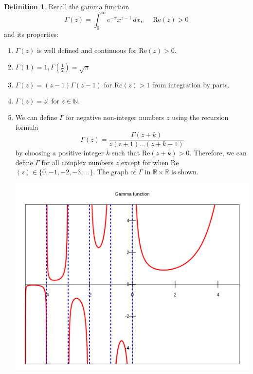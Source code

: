 \documentclass{article}
\theoremstyle{remark}
\theoremstyle{definition}
\newtheorem{definition}{Definition}[section]
\begin{document}
      \begin{definition}
      Recall the gamma function
      \[\Gamma (z) = \int_0^\infty e^{-x} x^{z-1} \,dx, \;\;\;\;\; \text{Re}(z) > 0\]
      and its properties: 
      \begin{enumerate}
          \item $\Gamma(z)$ is well defined and continuous for Re$(z) > 0$. 
          \item $\Gamma(1) = 1, \Gamma(\frac{1}{2}) = \sqrt{\pi}$
          \item $\Gamma(z) = (z-1) \Gamma (z-1)$ for Re$(z) > 1$ from integration by parts. 
          \item $\Gamma(z) = z!$ for $z \in \mathbb{N}$. 
          \item We can define $\Gamma$ for negative non-integer numbers $z$ using the recursion formula 
          \[\Gamma(z) = \frac{\Gamma(z+k)}{z (z+1) \ldots (z+k-1)}\]
          by choosing a positive integer $k$ such that Re$(z+k)>0$. Therefore, we can define $\Gamma$ for all complex numbers $z$ except for when Re$(z) \in \{0, -1, -2, -3, \ldots\}$. The graph of $\Gamma$ in $\mathbb{R} \times \mathbb{R}$ is shown. 
          \begin{center}
              \includegraphics[scale=0.25]{img/Gamma_plot.png}
          \end{center}
      \end{enumerate}
      \end{definition}
\end{document}
